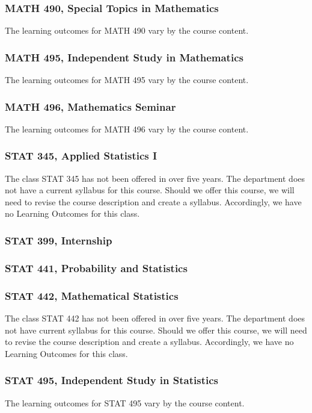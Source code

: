 \documentclass[10pt]{article}
\begin{document}
\subsubsection*{MATH 490, Special Topics in Mathematics}

The learning outcomes for MATH 490 vary by the course content.

\subsubsection*{MATH 495, Independent Study in Mathematics}


The learning outcomes for MATH 495 vary by the course content.

\subsubsection*{MATH 496, Mathematics Seminar}

The learning outcomes for MATH 496 vary by the course content.


\subsubsection*{STAT 345, Applied Statistics I}

The class STAT 345 has not been offered in over five years.  The
department does not have a current syllabus for this course. Should we offer this course,  we will need to revise
the course description and create a syllabus. Accordingly, we have no Learning Outcomes for this class.


\subsubsection*{STAT 399, Internship}

\subsubsection*{STAT 441, Probability and Statistics}


\subsubsection*{STAT 442, Mathematical Statistics}

The class STAT 442 has not been offered in over five years. The
department does not have current syllabus for this course. Should we offer this course,  we will need to revise
the course description and create a syllabus. Accordingly, we have no Learning Outcomes for this class.

\subsubsection*{STAT 495, Independent Study in Statistics}

The learning outcomes for STAT 495 vary by the course content.

\end{document}
